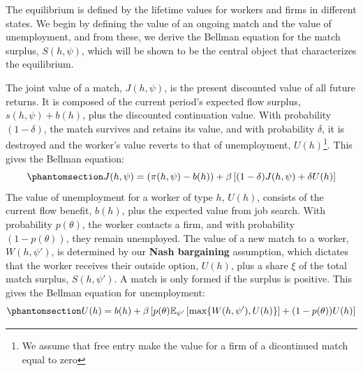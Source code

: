 \documentclass[
  11pt,
  letterpaper,
  DIV=11,
  numbers=noendperiod]{scrartcl}
\begin{document}
The equilibrium is defined by the lifetime values for workers and firms
in different states. We begin by defining the value of an ongoing match
and the value of unemployment, and from these, we derive the Bellman
equation for the match surplus, \(S(h,\psi)\), which will be shown to be
the central object that characterizes the equilibrium.

The joint value of a match, \(J(h, \psi)\), is the present discounted
value of all future returns. It is composed of the current period's
expected flow surplus, \(s(h,\psi)+b(h)\), plus the discounted
continuation value. With probability \((1-\delta)\), the match survives
and retains its value, and with probability \(\delta\), it is destroyed
and the worker's value reverts to that of unemployment,
\(U(h)\)\footnote{We assume that free entry make the value for a firm of
  a dicontinued match equal to zero}. This gives the Bellman equation:
\begin{equation}\phantomsection\label{eq-value-match}{ J(h, \psi) = \left( \pi(h,\psi) - b(h) \right) + \beta \left[ (1-\delta)J(h,\psi) + \delta U(h) \right] }\end{equation}
The value of unemployment for a worker of type \(h\), \(U(h)\), consists
of the current flow benefit, \(b(h)\), plus the expected value from job
search. With probability \(p(\theta)\), the worker contacts a firm, and
with probability \((1-p(\theta))\), they remain unemployed. The value of
a new match to a worker, \(W(h,\psi')\), is determined by our
\textbf{Nash bargaining} assumption, which dictates that the worker
receives their outside option, \(U(h)\), plus a share \(\xi\) of the
total match surplus, \(S(h, \psi')\). A match is only formed if the
surplus is positive. This gives the Bellman equation for unemployment:
\begin{equation}\phantomsection\label{eq-value-unemployment}{ U(h) = b(h) + \beta \left[ p(\theta)\mathbb{E}_{\psi'}\left[\max\{W(h,\psi'), U(h)\}\right] + (1-p(\theta))U(h) \right] }\end{equation}
\end{document}
